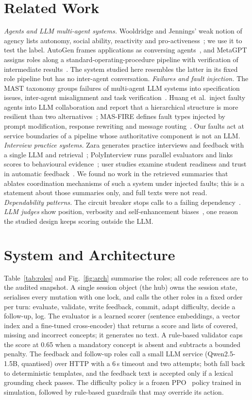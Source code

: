 \documentclass[runningheads]{llncs}
\begin{document}
\section{Related Work}
\emph{Agents and LLM multi-agent systems.} Wooldridge and Jennings' weak notion of agency lists autonomy, social ability, reactivity and pro-activeness~\cite{wj95}; we use it to test the label. AutoGen frames applications as conversing agents~\cite{autogen}, and MetaGPT assigns roles along a standard-operating-procedure pipeline with verification of intermediate results~\cite{metagpt}. The system studied here resembles the latter in its fixed role pipeline but has no inter-agent conversation. \emph{Failures and fault injection.} The MAST taxonomy groups failures of multi-agent LLM systems into specification issues, inter-agent misalignment and task verification~\cite{mast}. Huang et al.\ inject faulty agents into LLM collaboration and report that a hierarchical structure is more resilient than two alternatives~\cite{resil}; MAS-FIRE defines fault types injected by prompt modification, response rewriting and message routing~\cite{masfire}. Our faults act at service boundaries of a pipeline whose authoritative component is not an LLM. \emph{Interview practice systems.} Zara generates practice interviews and feedback with a single LLM and retrieval~\cite{zara}; PolyInterview runs parallel evaluators and links scores to behavioural evidence~\cite{polyint}; user studies examine student readiness and trust in automatic feedback~\cite{virt,chase}. We found no work in the retrieved summaries that ablates coordination mechanisms of such a system under injected faults; this is a statement about those summaries only, and full texts were not read. \emph{Dependability patterns.} The circuit breaker stops calls to a failing dependency~\cite{nygard}. \emph{LLM judges} show position, verbosity and self-enhancement biases~\cite{judge}, one reason the studied design keeps scoring outside the LLM.

\section{System and Architecture}\label{sec:arch}
Table~\ref{tab:roles} and Fig.~\ref{fig:arch} summarise the roles; all code references are to the audited snapshot. A single session object (the hub) owns the session state, serialises every mutation with one lock, and calls the other roles in a fixed order per turn: evaluate, validate, write feedback, commit, adapt difficulty, decide a follow-up, log. The evaluator is a learned scorer (sentence embeddings, a vector index and a fine-tuned cross-encoder) that returns a score and lists of covered, missing and incorrect concepts; it generates no text. A rule-based validator caps the score at 0.65 when a mandatory concept is absent and subtracts a bounded penalty. The feedback and follow-up roles call a small LLM service (Qwen2.5-1.5B, quantised) over HTTP with a 6\,s timeout and two attempts; both fall back to deterministic templates, and the feedback text is accepted only if a lexical grounding check passes. The difficulty policy is a frozen PPO~\cite{ppo,sb3} policy trained in simulation, followed by rule-based guardrails that may override its action.
\end{document}
